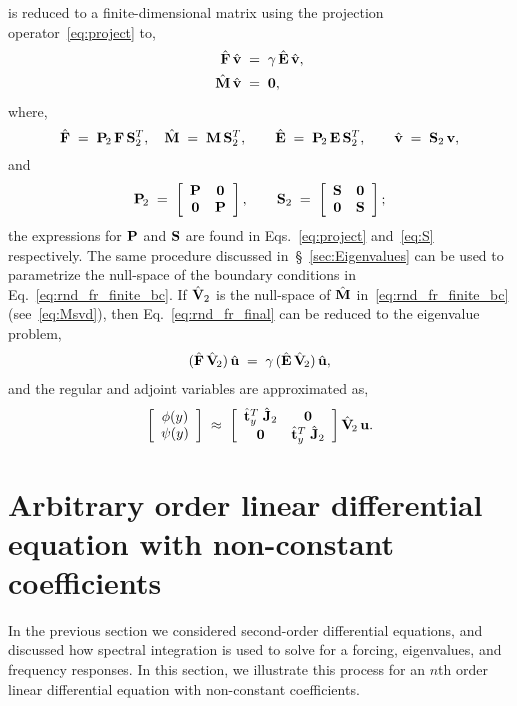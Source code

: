 \documentclass[%
secnumarabic,%
 amssymb, amsmath,%
 aps,prf,superscriptaddress,longbibliography
frontmatterverbose,
]{revtex4-2}
\newcommand{\sref}[1]{\S~\ref{#1}}
\begin{document}
is reduced to a finite-dimensional matrix using the projection operator~\eqref{eq:project} to,
\begin{subequations}\label{eq:rnd_fr_final}
\begin{align}
  \hat {\mathbf{F}} \, \hat{\mathbf{v}} \;&=\; \gamma \,\hat{\mathbf{E}} \,\hat{\mathbf{v}},\\
  \hat{\mathbf{M}} \,\hat{\mathbf{v}} \;&=\; \mathbf 0,\label{eq:rnd_fr_finite_bc}
\end{align}
\end{subequations}
where,
$$
\hat{\mathbf{F}} \;=\;  \mathbf{P}_{\!2} \,\mathbf{F} \,\mathbf{S}_2^T, \quad 
\hat{\mathbf{M}} \;=\;  \mathbf{M} \,\mathbf{S}_{2}^T, \qquad 
\hat{\mathbf{E}} \;=\;  \mathbf{P}_{\!2} \,\mathbf{E} \,\mathbf{S}_2^T, \qquad 
\hat{\mathbf{v}} \;=\; \mathbf{S}_2\, \mathbf{v},
$$
and 
$$
\mathbf{P}_{\!2} \;=\; \left[\begin{array}{cc}
\mathbf{P} & \mathbf 0  \\
\mathbf 0 & \mathbf{P}
\end{array}\right], \qquad  \mathbf{S}_{2} \;=\; \left[\begin{array}{cc}
  \mathbf{S} & \mathbf 0\\
  \mathbf 0 & \mathbf{S}
  \end{array}\right];
$$
the expressions for $\mathbf{P}$ and $\mathbf{S}$ are found in Eqs.~\eqref{eq:project} and~\eqref{eq:S} respectively. The same procedure discussed in~\sref{sec:Eigenvalues} can be used to parametrize the null-space of the boundary conditions in Eq.~\eqref{eq:rnd_fr_finite_bc}. If $\hat{\mathbf{V}}_2$ is the null-space of $\hat{\mathbf{M}}$ in~\eqref{eq:rnd_fr_finite_bc}  (see~\eqref{eq:Msvd}), then Eq.~\eqref{eq:rnd_fr_final} can be reduced to the eigenvalue problem,
\begin{align}
  (\hat{\mathbf{F}} \,\hat{\mathbf{V}}_{\! 2})\,\hat{\mathbf{u}} \;=\; \gamma \,(\hat{\mathbf{E}}\, \hat{\mathbf{V}}_{\! 2})\, \hat{\mathbf{u}},
\end{align}
and the regular and adjoint variables are approximated as,
\begin{align}
  \left[\begin{array}{c}
    \phi (y)\\
    \psi (y)
  \end{array}\right] \;\approx\; 
  \left[\begin{array}{cc}
    \hat{\mathbf{t}}_y^T\; \hat{\mathbf{J}}_2 & \mathbf 0\\
    \mathbf 0 & \hat{\mathbf{t}}_y^T\; \hat{\mathbf{J}}_2
  \end{array}\right] \hat{\mathbf{V}}_{\!2} \, \mathbf{u}.
\end{align}     
\section{Arbitrary order linear differential equation with non-constant coefficients}
In the previous section we considered second-order differential equations, and discussed how spectral integration is used to solve for a forcing, eigenvalues, and frequency responses. In this section, we illustrate this process for an $n$th order linear differential equation with non-constant coefficients. 
\end{document}
